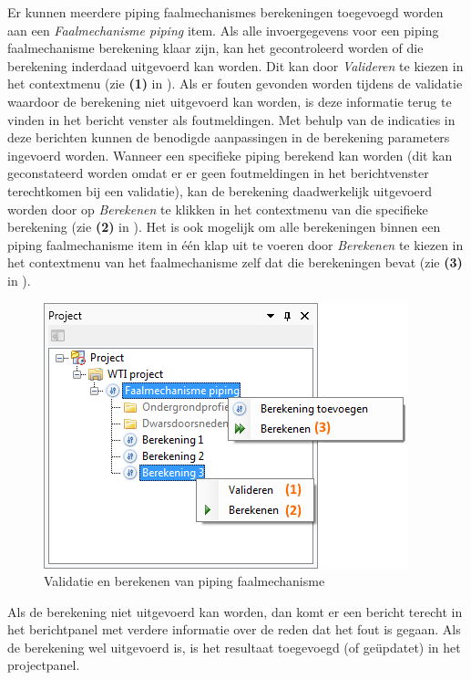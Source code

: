 Er kunnen meerdere piping faalmechanismes berekeningen toegevoegd worden aan een \textit{Faalmechanisme piping} item.
Als alle invoergegevens voor een piping faalmechanisme berekening klaar zijn, kan het gecontroleerd worden of die berekening inderdaad uitgevoerd kan worden. Dit kan door \textit{Valideren} te kiezen in het contextmenu (zie \textbf{(1)} in ). Als er fouten gevonden worden tijdens de validatie waardoor de berekening niet uitgevoerd kan worden, is deze informatie terug te vinden in het bericht venster als foutmeldingen. Met behulp van de indicaties in deze berichten kunnen de benodigde aanpassingen in de berekening parameters ingevoerd worden. 
Wanneer een specifieke piping berekend kan worden (dit kan geconstateerd worden omdat er er geen foutmeldingen in het berichtvenster terechtkomen bij een validatie), kan de berekening daadwerkelijk uitgevoerd worden door op \textit{Berekenen} te klikken in het contextmenu van die specifieke berekening (zie \textbf{(2)} in ).
Het is ook mogelijk om alle berekeningen binnen een piping faalmechanisme item in één klap uit te voeren door \textit{Berekenen} te kiezen in het contextmenu van het faalmechanisme zelf dat die berekeningen bevat (zie \textbf{(3)} in ).

\begin{figure} [H]
	\centering
		\includegraphics{figures/chapter_piping/validateAndRunPiping}
	\caption{Validatie en berekenen van piping faalmechanisme}
	\label{fig:piping.validateAndRunPiping}
\end{figure}


Als de berekening niet uitgevoerd kan worden, dan komt er een bericht terecht in het berichtpanel met verdere informatie over de reden dat het fout is gegaan. Als de berekening wel uitgevoerd is, is het resultaat toegevoegd (of ge\"{u}pdatet) in het projectpanel.





